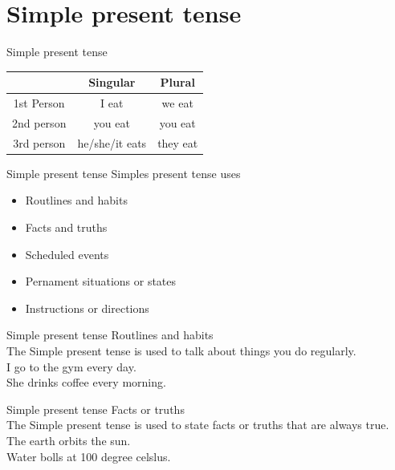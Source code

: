 \documentclass{beamer}
\begin{document}
\section{Simple present tense}

\begin{frame}{Simple present tense}
\centering
\begin{tabular}{|c|c|c|}
\hline
 & Singular & Plural\\
\hline
1st Person & I eat & we eat\\
\hline
2nd person & you eat & you eat\\
\hline
3rd person & he/she/it eats & they eat\\
\hline
\end{tabular}    
\end{frame}
\begin{frame}{Simple present tense}
\centering
Simples present tense uses\\
\vspace{0.3in}
\begin{itemize}
\item[$\rightarrow$]  Routlines and habits\\
\item[$\rightarrow$]  Facts and truths\\
\item [$\rightarrow$] Scheduled events\\
\item[$\rightarrow$] Pernament situations or states\\
\item [$\rightarrow$] Instructions or directions\\  
\end{itemize}
\end{frame}

\begin{frame}{Simple present tense}
\centering
Routlines and habits\\
\vspace{0.2in}
The Simple present tense is used to talk about things you do regularly.\\
\vspace{0.4in}
I go to the gym every day.\\
She drinks coffee every morning.\\   
\end{frame}
\begin{frame}{Simple present tense}
\centering
Facts or truths\\
\vspace{0.2in}
The Simple present tense is used to state facts or truths that are always true.\\
\vspace{0.4in}
The earth orbits the sun.\\
Water bolls at 100 degree celslus.\\
\end{frame}
\end{document}

